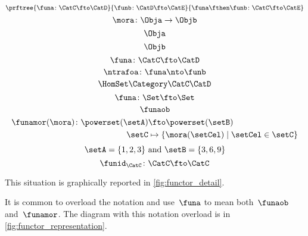 {\begin{forslides}
\begin{equation}
\prftree{\funa\colon \CatC \fto \CatD}{\funb\colon\CatD\fto\CatE}{\funa\fthen\funb\colon \CatC \fto \CatE}
\end{equation}
\begin{equation}\label{eq:slides_mora}
\mora\colon \Obja\to\Objb
\end{equation}
\begin{equation}\label{eq:slides_mora_obja}
 \Obja
\end{equation}
\begin{equation}\label{eq:slides_mora_objb}
 \Objb
\end{equation}
\begin{equation}\label{eq:slides_funa}
 \funa\colon\CatC\fto\CatD
\end{equation}
\begin{equation}\label{eq:slides_ntrafoa}
 \ntrafoa\colon\funa\nto\funb
\end{equation}
\begin{equation}\label{eq:slides_hom}
 \HomSet\Category\CatC\CatD
\end{equation}
  \begin{equation}\label{eq:pow_fun_1}
    \funa\colon \Set \fto \Set
\end{equation}
    \begin{equation}
\label{eq:pow_fun_2}
    \funaob
\end{equation}
      \begin{equation}
\label{eq:pow_fun_3}
\begin{aligned}
    \funamor(\mora)\colon \powerset(\setA)&\fto \powerset(\setB)\\
    \setC&\mapsto \{ \mora(\setCel) \mid \setCel \in \setC\}
\end{aligned}
\end{equation}
\begin{equation}
  \label{eq:pow_fun_4}
    \setA=\{ 1,2,3\} \text{ and }\setB=\{3,6,9\}
\end{equation}
  \begin{equation}
  \label{eq:idfun}
    \funid_\CatC \colon \CatC \fto \CatC
\end{equation}
\end{forslides}
}

This situation is graphically reported in \cref{fig:functor_detail}.

It is common to overload the notation and use~$\funa$ to mean both~$\funaob$ and~$\funamor$. The diagram with this notation overload is in \cref{fig:functor_representation}.

